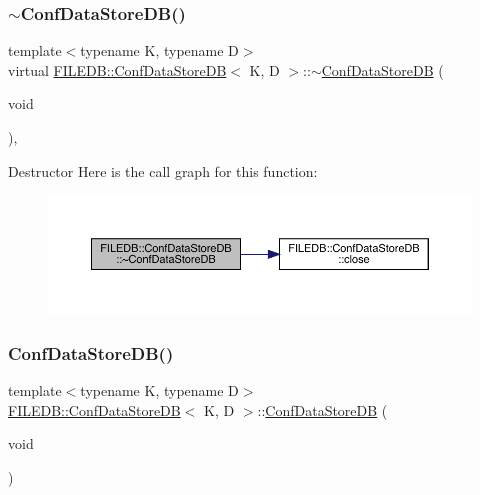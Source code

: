 \subsubsection{\texorpdfstring{$\sim$ConfDataStoreDB()}{~ConfDataStoreDB()}\hspace{0.1cm}{\footnotesize\ttfamily [2/3]}}
{\footnotesize\ttfamily template$<$typename K, typename D$>$ \\
virtual \mbox{\hyperlink{classFILEDB_1_1ConfDataStoreDB}{F\+I\+L\+E\+D\+B\+::\+Conf\+Data\+Store\+DB}}$<$ K, D $>$\+::$\sim$\mbox{\hyperlink{classFILEDB_1_1ConfDataStoreDB}{Conf\+Data\+Store\+DB}} (\begin{DoxyParamCaption}\item[{void}]{ }\end{DoxyParamCaption})\hspace{0.3cm}{\ttfamily [inline]}, {\ttfamily [virtual]}}

Destructor Here is the call graph for this function\+:
\nopagebreak
\begin{figure}[H]
\begin{center}
\leavevmode
\includegraphics[width=350pt]{d8/d19/classFILEDB_1_1ConfDataStoreDB_a39b48750dbc9bd0d4ca8c9787edee897_cgraph}
\end{center}
\end{figure}
\mbox{\label{classFILEDB_1_1ConfDataStoreDB_a575d901daeccae08bcda5b2a60681e1b}} 
\subsubsection{\texorpdfstring{ConfDataStoreDB()}{ConfDataStoreDB()}\hspace{0.1cm}{\footnotesize\ttfamily [3/3]}}
{\footnotesize\ttfamily template$<$typename K, typename D$>$ \\
\mbox{\hyperlink{classFILEDB_1_1ConfDataStoreDB}{F\+I\+L\+E\+D\+B\+::\+Conf\+Data\+Store\+DB}}$<$ K, D $>$\+::\mbox{\hyperlink{classFILEDB_1_1ConfDataStoreDB}{Conf\+Data\+Store\+DB}} (\begin{DoxyParamCaption}\item[{void}]{ }\end{DoxyParamCaption})\hspace{0.3cm}{\ttfamily [inline]}}

